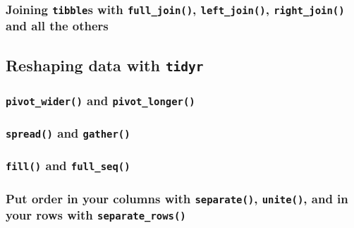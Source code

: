 \documentclass[]{gitbook}
\begin{document}
\hypertarget{joining-tibbles-with-full_join-left_join-right_join-and-all-the-others}{%
\subsubsection{\texorpdfstring{Joining \texttt{tibble}s with \texttt{full\_join()}, \texttt{left\_join()}, \texttt{right\_join()} and all the others}{Joining tibbles with full\_join(), left\_join(), right\_join() and all the others}}\label{joining-tibbles-with-full_join-left_join-right_join-and-all-the-others}}

\hypertarget{reshaping-data-with-tidyr}{%
\subsection{\texorpdfstring{Reshaping data with \texttt{tidyr}}{Reshaping data with tidyr}}\label{reshaping-data-with-tidyr}}

\hypertarget{pivot_wider-and-pivot_longer}{%
\subsubsection{\texorpdfstring{\texttt{pivot\_wider()} and \texttt{pivot\_longer()}}{pivot\_wider() and pivot\_longer()}}\label{pivot_wider-and-pivot_longer}}

\hypertarget{spread-and-gather}{%
\subsubsection{\texorpdfstring{\texttt{spread()} and \texttt{gather()}}{spread() and gather()}}\label{spread-and-gather}}

\hypertarget{fill-and-full_seq}{%
\subsubsection{\texorpdfstring{\texttt{fill()} and \texttt{full\_seq()}}{fill() and full\_seq()}}\label{fill-and-full_seq}}

\hypertarget{put-order-in-your-columns-with-separate-unite-and-in-your-rows-with-separate_rows}{%
\subsubsection{\texorpdfstring{Put order in your columns with \texttt{separate()}, \texttt{unite()}, and in your rows with \texttt{separate\_rows()}}{Put order in your columns with separate(), unite(), and in your rows with separate\_rows()}}\label{put-order-in-your-columns-with-separate-unite-and-in-your-rows-with-separate_rows}}
\end{document}
